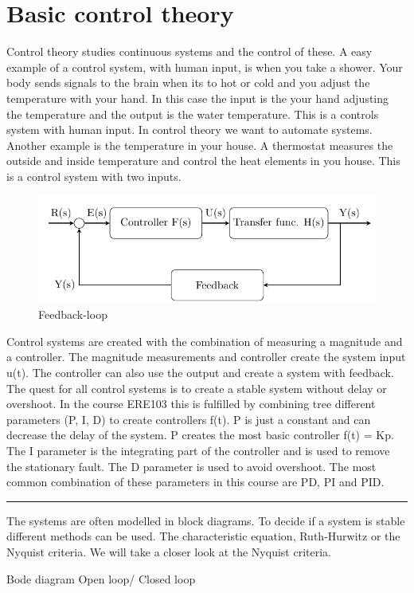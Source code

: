 \section{Basic control theory}


Control theory studies continuous systems and the control of these. A easy example of a control system, with human input, is when you take a shower. Your body sends signals to the brain when its to hot or cold and you adjust the temperature with your hand. In this case the input is the your hand adjusting the temperature and the output is the water temperature. This is a controls system with human input. In control theory we want to automate systems. Another example is the temperature in your house. A thermostat measures the outside and inside temperature and control the heat elements in you house. This is a control system with two inputs.

\begin{figure}[H]
    \centering
    \includegraphics[]{feedback.PNG}
    \caption{Feedback-loop}
    \label{fig:feed}
\end{figure}


Control systems are created with the combination of measuring a magnitude and a controller. The magnitude measurements and controller create the system input u(t). The controller can also use the output and create a system with feedback. The quest for all control systems is to create a stable system without delay or overshoot. In the course ERE103 this is fulfilled by combining tree different parameters (P, I, D) to create controllers f(t).  P is just a constant and can decrease the delay of the system. P creates the most basic controller f(t) = Kp. The I parameter is the integrating part of the controller and is used to remove the stationary fault. The D parameter is used to avoid overshoot. The most common combination of these parameters in this course are PD, PI and PID.
\hrule
The systems are often modelled in block diagrams.
To decide if a system is stable different methods can be used. The characteristic equation, Ruth-Hurwitz or the Nyquist criteria. We will take a closer look at the Nyquist criteria. 

Bode diagram
Open loop/ Closed loop





